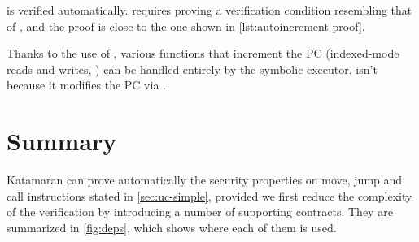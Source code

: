  is verified automatically.  requires proving a verification condition resembling that of , and the proof is close to the one shown in \cref{lst:autoincrement-proof}.

Thanks to the use of , various functions that increment the PC (indexed-mode reads and writes, ) can be handled entirely by the symbolic executor.  isn't because it modifies the PC via .

\section{Summary}

Katamaran can prove automatically the security properties on move, jump and call instructions stated in \cref{sec:uc-simple}, provided we first reduce the complexity of the verification by introducing a number of supporting contracts. They are summarized in \cref{fig:deps}, which shows where each of them is used.


